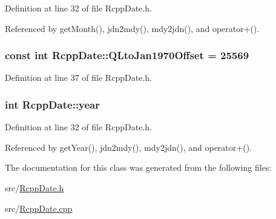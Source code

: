 Definition at line 32 of file RcppDate.h.

Referenced by getMonth(), jdn2mdy(), mdy2jdn(), and operator+().\hypertarget{classRcppDate_a06b285d4a04c5225a067e76d4fbfd2d4}{
\subsubsection[{QLtoJan1970Offset}]{\setlength{\rightskip}{0pt plus 5cm}const int {\bf RcppDate::QLtoJan1970Offset} = 25569}}
\label{classRcppDate_a06b285d4a04c5225a067e76d4fbfd2d4}


Definition at line 37 of file RcppDate.h.\hypertarget{classRcppDate_a8881f654ebf42cdf71fdcfce402f0cad}{
\subsubsection[{year}]{\setlength{\rightskip}{0pt plus 5cm}int {\bf RcppDate::year}}}
\label{classRcppDate_a8881f654ebf42cdf71fdcfce402f0cad}


Definition at line 32 of file RcppDate.h.

Referenced by getYear(), jdn2mdy(), mdy2jdn(), and operator+().

The documentation for this class was generated from the following files:\begin{DoxyCompactItemize}
\item 
src/\hyperlink{RcppDate_8h}{RcppDate.h}\item 
src/\hyperlink{RcppDate_8cpp}{RcppDate.cpp}\end{DoxyCompactItemize}
